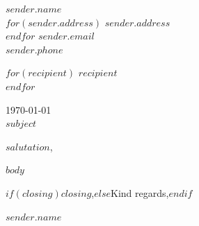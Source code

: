 \documentclass[10pt,a4paper]{article}
\begin{document}
\fontsize{10}{15}\selectfont

\hfill
\begin{minipage}[t]{0.45\textwidth}
\raggedleft
{\fontsize{12}{16}\selectfont $sender.name$}\\
$for(sender.address)$
$sender.address$\\
$endfor$
$sender.email$\\
$sender.phone$
\end{minipage}

\vspace{2em}

$for(recipient)$
$recipient$\\
$endfor$

\vspace{1.5em}

{\color{muted}\today}\\
\textbf{$subject$}

\vspace{1em}

$salutation$,

$body$

$if(closing)$$closing$,$else$Kind regards,$endif$

\vspace{2.5em}

$sender.name$
\end{document}
